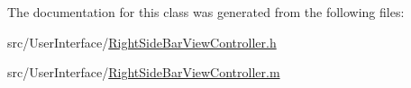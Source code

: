 The documentation for this class was generated from the following files\-:\begin{DoxyCompactItemize}
\item 
src/\-User\-Interface/\hyperlink{_right_side_bar_view_controller_8h}{Right\-Side\-Bar\-View\-Controller.\-h}\item 
src/\-User\-Interface/\hyperlink{_right_side_bar_view_controller_8m}{Right\-Side\-Bar\-View\-Controller.\-m}\end{DoxyCompactItemize}
